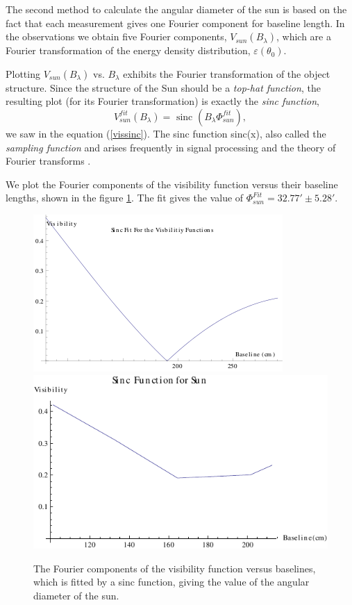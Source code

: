The second method to calculate the angular diameter of the sun is based on the fact that each measurement gives one Fourier component for baseline length. In the observations we obtain five Fourier components, $V_{sun}(B_{\lambda})$, which are a Fourier transformation of the energy density distribution, $\varepsilon(\theta_0)$. 

Plotting   $V_{sun}(B_{\lambda})$ vs. $B_{\lambda}$  exhibits  the Fourier transformation of the object structure. Since the structure of the Sun should be a {\it top-hat function}, the resulting plot (for its Fourier transformation) is exactly the {\it sinc function},
$$V^{fit}_{sun}(B_{\lambda}) = \mbox{ sinc }(B_{\lambda} {\Phi^{fit}_{sun}}),$$
 we saw in the equation (\ref{vissinc}). The sinc function sinc(x), also called the {\it sampling function} and  arises frequently in signal processing and the theory of Fourier transforms \cite{wiki}. 

We plot the Fourier components of the visibility function versus their baseline lengths, shown in the figure \ref{sing}. The fit gives the value of  $\Phi^{Fit}_{sun}= 32.77' \pm 5.28'$.




 \begin{figure}[htb]
\begin{center}
 \includegraphics[scale=0.85]{plots/sinc3.png}
 \includegraphics[scale=0.85]{plots/sinc1.pdf}
\caption{The Fourier components of the visibility function versus baselines, which is fitted by a sinc function, giving the value of the angular diameter of the sun. }
\label{sing}
\end{center}
\end{figure}



